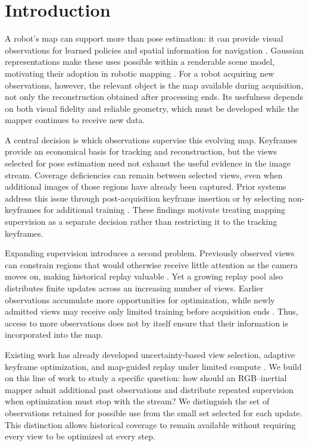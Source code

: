 \section{Introduction}

A robot's map can support more than pose estimation: it can provide visual
observations for learned policies and spatial information for navigation
\cite{splat_nav,splatsim}. Gaussian representations make these uses possible
within a renderable scene model, motivating their adoption in robotic mapping
\cite{gs_autonomy}. For a robot acquiring new observations, however, the
relevant object is the map available during acquisition, not only the
reconstruction obtained after processing ends. Its usefulness depends on both
visual fidelity and reliable geometry, which must be developed while the
mapper continues to receive new data.

A central decision is which observations supervise this evolving map.
Keyframes provide an economical basis for tracking and reconstruction, but
the views selected for pose estimation need not exhaust the useful evidence
in the image stream. Coverage deficiencies can remain between selected views,
even when additional images of those regions have already been captured.
Prior systems address this issue through post-acquisition keyframe insertion
or by selecting non-keyframes for additional training
\cite{hi_slam2,online_nvs}. These findings motivate treating mapping
supervision as a separate decision rather than restricting it to the
tracking keyframes.

Expanding supervision introduces a second problem. Previously observed views
can constrain regions that would otherwise receive little attention as the
camera moves on, making historical replay valuable \cite{imap,monogs}.
Yet a growing replay pool also distributes finite updates across an
increasing number of views. Earlier observations accumulate more opportunities
for optimization, while newly admitted views may receive only limited training
before acquisition ends \cite{cartgs}. Thus, access to more observations does
not by itself ensure that their information is incorporated into the map.

Existing work has already developed uncertainty-based view selection,
adaptive keyframe optimization, and map-guided replay under limited compute
\cite{online_nvs,cartgs,eligsir}. We build on this line of work to study a
specific question: how should an RGB--inertial mapper admit additional past
observations and distribute repeated supervision when optimization must stop
with the stream? We distinguish the set of observations retained for possible
use from the small set selected for each update. This distinction allows
historical coverage to remain available without requiring every view to be
optimized at every step.

